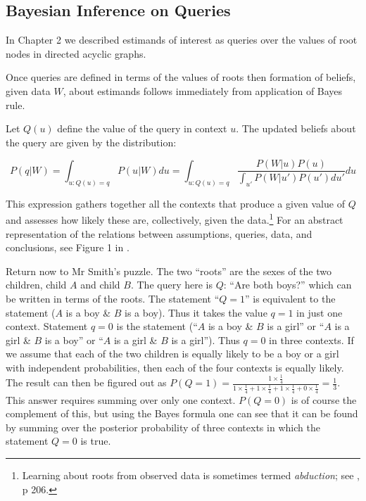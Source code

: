 \documentclass[
  12pt,
]{book}
\begin{document}
\hypertarget{bayesian-inference-on-queries}{%
\subsection{Bayesian Inference on Queries}\label{bayesian-inference-on-queries}}

In Chapter 2 we described estimands of interest as queries over the values of root nodes in directed acyclic graphs.

Once queries are defined in terms of the values of roots then formation of beliefs, given data \(W\), about estimands follows immediately from application of Bayes rule.

Let \(Q(u)\) define the value of the query in context \(u\). The updated beliefs about the query are given by the distribution:

\[P(q | W) = \int_{u:Q(u) = q} P(u|W)du =  \int_{u:Q(u) = q} \frac{P(W|u)P(u)}{\int_{u'}P(W|u')P(u')du'}du\]

This expression gathers together all the contexts that produce a given value of \(Q\) and assesses how likely these are, collectively, given the data.\footnote{Learning about roots from observed data is sometimes termed \emph{abduction}; see \citet{pearl2009causality}, p 206.} For an abstract representation of the relations between assumptions, queries, data, and conclusions, see Figure 1 in \citet{pearl2012causal}.

Return now to Mr Smith's puzzle. The two ``roots'' are the sexes of the two children, child \(A\) and child \(B\). The query here is \(Q\): ``Are both boys?'' which can be written in terms of the roots. The statement ``\(Q=1\)'' is equivalent to the statement (\(A\) is a boy \& \(B\) is a boy). Thus it takes the value \(q=1\) in just one context. Statement \(q=0\) is the statement (``\(A\) is a boy \& \(B\) is a girl'' or ``\(A\) is a girl \& \(B\) is a boy'' or ``\(A\) is a girl \& \(B\) is a girl''). Thus \(q=0\) in three contexts. If we assume that each of the two children is equally likely to be a boy or a girl with independent probabilities, then each of the four contexts is equally likely.
The result can then be figured out as \(P(Q=1) = \frac{1\times \frac{1}{4}}{1\times \frac{1}{4} + 1\times \frac{1}{4}+1\times \frac{1}{4}+0\times \frac{1}{4}} = \frac{1}{3}\). This answer requires summing over only one context. \(P(Q=0)\) is of course the complement of this, but using the Bayes formula one can see that it can be found by summing over the posterior probability of three contexts in which the statement \(Q=0\) is true.
\end{document}
